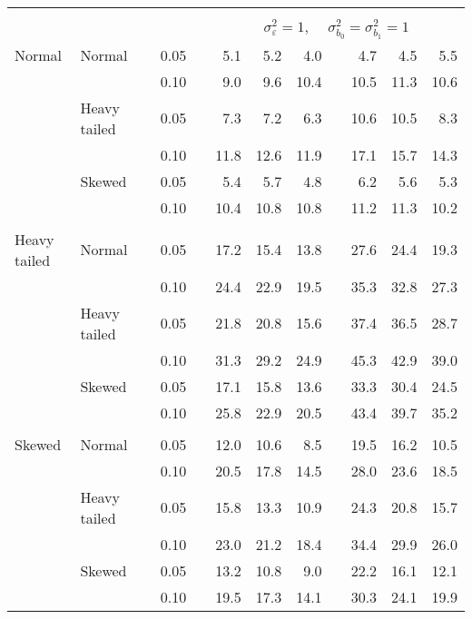 \begin{table}[ht]
\begin{scriptsize}
\begin{tabular}{ll p{.1cm} c p{.1cm} rrr p{.1cm} rrr}
&&&&&&&&&&&\\
& && && \multicolumn{7}{c}{$\sigma_{\varepsilon}^2 = 1$, \ \ $\sigma_{b_0}^2 = \sigma_{b_1}^2 = 1$} \\ \cline{6-12}
\rowcolor{gray!20} Normal & Normal &  & 0.05 &  & 5.1 & 5.2 & 4.0 &  & 4.7 & 4.5 & 5.5 \\ 
\rowcolor{gray!20}    &  &  & 0.10 &  & 9.0 & 9.6 & 10.4 &  & 10.5 & 11.3 & 10.6 \\ 
\rowcolor{gray!20}    & Heavy tailed &  & 0.05 &  & 7.3 & 7.2 & 6.3 &  & 10.6 & 10.5 & 8.3 \\ 
\rowcolor{gray!20}    &  &  & 0.10 &  & 11.8 & 12.6 & 11.9 &  & 17.1 & 15.7 & 14.3 \\ 
\rowcolor{gray!20}    & Skewed &  & 0.05 &  & 5.4 & 5.7 & 4.8 &  & 6.2 & 5.6 & 5.3 \\ 
\rowcolor{gray!20}    &  &  & 0.10 &  & 10.4 & 10.8 & 10.8 &  & 11.2 & 11.3 & 10.2 \\ 
&&&&&&&&&&&\\
  Heavy tailed & Normal &  & 0.05 &  & 17.2 & 15.4 & 13.8 &  & 27.6 & 24.4 & 19.3 \\ 
   &  &  & 0.10 &  & 24.4 & 22.9 & 19.5 &  & 35.3 & 32.8 & 27.3 \\ 
   & Heavy tailed &  & 0.05 &  & 21.8 & 20.8 & 15.6 &  & 37.4 & 36.5 & 28.7 \\ 
   &  &  & 0.10 &  & 31.3 & 29.2 & 24.9 &  & 45.3 & 42.9 & 39.0 \\ 
   & Skewed &  & 0.05 &  & 17.1 & 15.8 & 13.6 &  & 33.3 & 30.4 & 24.5 \\ 
   &  &  & 0.10 &  & 25.8 & 22.9 & 20.5 &  & 43.4 & 39.7 & 35.2 \\ 
&&&&&&&&&&&\\
  Skewed & Normal &  & 0.05 &  & 12.0 & 10.6 & 8.5 &  & 19.5 & 16.2 & 10.5 \\ 
   &  &  & 0.10 &  & 20.5 & 17.8 & 14.5 &  & 28.0 & 23.6 & 18.5 \\ 
   & Heavy tailed &  & 0.05 &  & 15.8 & 13.3 & 10.9 &  & 24.3 & 20.8 & 15.7 \\ 
   &  &  & 0.10 &  & 23.0 & 21.2 & 18.4 &  & 34.4 & 29.9 & 26.0 \\ 
   & Skewed &  & 0.05 &  & 13.2 & 10.8 & 9.0 &  & 22.2 & 16.1 & 12.1 \\ 
   &  &  & 0.10 &  & 19.5 & 17.3 & 14.1 &  & 30.3 & 24.1 & 19.9 \\ 



\end{tabular}
\end{scriptsize}
\end{table}
